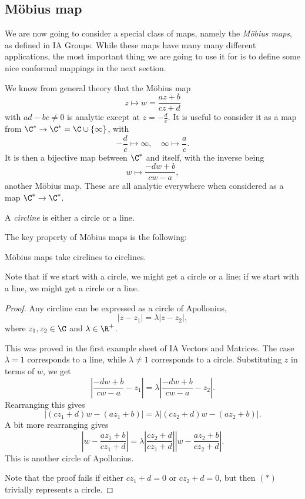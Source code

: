 \documentclass[a4paper]{article}
\begin{document}
\subsection{\texorpdfstring{M\"obius}{Mobius} map}
We are now going to consider a special class of maps, namely the \emph{M\"obius maps}, as defined in IA Groups. While these maps have many many different applications, the most important thing we are going to use it for is to define some nice conformal mappings in the next section.

We know from general theory that the M\"obius map
\[
  z \mapsto w = \frac{az + b}{cz + d}
\]
with $ad - bc \not= 0$ is analytic except at $z = -\frac{d}{c}$. It is useful to consider it as a map from $\C^* \to \C^* = \C \cup \{\infty\}$, with
\[
  -\frac{d}{c} \mapsto \infty,\quad \infty \mapsto \frac{a}{c}.
\]
It is then a bijective map between $\C^*$ and itself, with the inverse being
\[
  w \mapsto \frac{-d w + b}{cw - a},
\]
another M\"obius map. These are all analytic everywhere when considered as a map $\C^* \to \C^*$.

\begin{defi}[Circline]
  A \emph{circline} is either a circle or a line.
\end{defi}

The key property of M\"obius maps is the following:
\begin{prop}
  M\"obius maps take circlines to circlines.
\end{prop}
Note that if we start with a circle, we might get a circle or a line; if we start with a line, we might get a circle or a line.

\begin{proof}
  Any circline can be expressed as a circle of Apollonius,
  \[
    |z - z_1| = \lambda |z - z_2|,
  \]
  where $z_1, z_2 \in \C$ and $\lambda \in \R^+$.

  This was proved in the first example sheet of IA Vectors and Matrices. The case $\lambda = 1$ corresponds to a line, while $\lambda \not= 1$ corresponds to a circle. Substituting $z$ in terms of $w$, we get
  \[
    \left|\frac{-dw + b}{cw - a} - z_1\right| = \lambda \left|\frac{-dw + b}{cw - a} - z_2 \right|.
  \]
  Rearranging this gives
  \[
    |(cz_1 + d) w - (az_1 + b)| = \lambda|(cz_2 + d)w - (az_2 + b)|.\tag{$*$}
  \]
  A bit more rearranging gives
  \[
    \left|w - \frac{az_1 + b}{cz_1 + d}\right| = \lambda \left|\frac{cz_2 + d}{cz_1 + d}\right|\left|w - \frac{az_2 + b}{cz_2 + d}\right|.
  \]
  This is another circle of Apollonius.

  Note that the proof fails if either $cz_1 + d = 0$ or $cz_2 + d = 0$, but then $(*)$ trivially represents a circle.
\end{proof}
\end{document}
